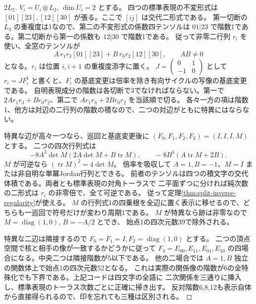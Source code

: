 \begin{proof}[$2L_2$]
$V_i=U_i\otimes L_2$, $\dim U_i=2$ とする。
四つの標準表現の不変形式は $[01][23],[12][30]$ が張る。ここで $[ij]$ は交代二形式である。
第一切断の $L_3$ の重複度は1なので、第二の不変形式の係数四テンソルは
$01|23$ で階数1である。第二切断から第一の係数も $12|30$ で階数1である。
従って非零二行列 $r_i$ を使い、全窓のテンソルが
\[
   A\, r_1 r_3[01][23]+B\,r_0 r_2[12][30],\qquad AB\ne0
\]
となる。$r_i$ は位置 $i,i+1$ の重複度添字に置く。
$J=\left(\begin{smallmatrix}0&1\\-1&0\end{smallmatrix}\right)$ として
$r_i=JF_i^{\mathsf t}$ と書くと、$F_i$ の基底変更は倍率を除き有向サイクルの写像の基底変更である。
自明表現成分の階数は各切断で3でなければならない。第一で
$2A r_1r_3+B r_0r_2$、第二で $A r_1r_3+2B r_0r_2$ を当該順で切る。
各々一方の項は階数1、他方は対辺の二行列の階数の積なので、二つの対辺がともに特異にはならない。

特異な辺が高々一つなら、巡回と基底変更後に $(F_0,F_1,F_2,F_3)=(I,I,I,M)$ とする。
二つの四次行列式は
\[
 -8A^3\det M(2A\det M+B\operatorname{tr}M),\qquad
 -8B^3(A\operatorname{tr}M+2B).
\]
$M$ が可逆なら $(\operatorname{tr}M)^2=4\det M$。
倍率を吸収して $A=1,B=-1$、$M=I$ または非自明な単冪Jordan行列とできる。
前者のテンソルは四つの積文字の交代体積である。両者とも標準表現の対角トーラスで
二平面ずつに分ければ純次数の二形式は $r_i$ の非零倍で、全て可逆である。
従って定理\ref{thm:split-inverse-regularity}が使える。
$M$ の行列式1の四乗根を全辺に置く表示に移せるので、どちらも一巡回で符号だけが変わり周期1である。
$M$ が特異なら跡は非零なので $M=\operatorname{diag}(1,0)$, $B=-A/2$ とでき、
始点1の四次元数39で除外される。

特異な二辺は隣接するので $F_0=F_1=I,F_2=\operatorname{diag}(1,0)$ とする。
二つの頂点空間で核と相手の像が一致するかどうかに従って
$F_3=E_{00},E_{11},E_{01},E_{10}$ の四場合になる。中央二つは隣接階数が5以下である。
他の二場合では $A=1,B$ 独立の関数体上で始点1の四次元数52となる。
これは実際の関係像の階数が6の全特殊化でも下界である。上記コードは四文字の全語に
二次関係を三通りに挿入し、標準表現のトーラス次数ごとに正確に掃き出す。
反対階数6,8,12も表示自体から直接得られるので、印を忘れても三種は区別される。
\end{proof}

